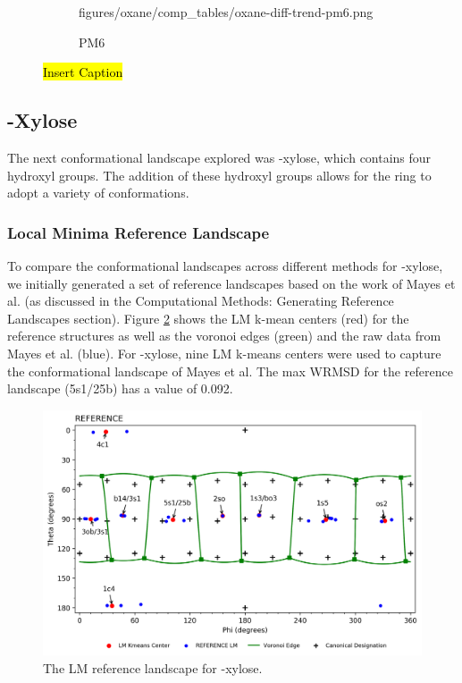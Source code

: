 \documentclass{article}
\begin{document}
\begin{figure}[H]
\begin{subfigure}[b]{0.3\textwidth}
		{figures/oxane/comp_tables/oxane-diff-trend-pm6.png}
		\caption{PM6}
	\end{subfigure}
\caption{\hl{Insert Caption}}
\label{fig:oxane-ALL-LM}
\end{figure}



\newpage
\subsection{\textbeta-Xylose}
The next conformational landscape explored was \textbeta-xylose, which contains four hydroxyl groups. The addition of 
these hydroxyl groups allows for the ring to adopt a variety of conformations. 

\subsubsection{Local Minima Reference Landscape}
To compare the conformational landscapes across different methods for \textbeta-xylose, we initially generated a set of reference landscapes 
based on the work of Mayes et al. (as discussed in the Computational Methods: Generating Reference Landscapes section). Figure 
\ref{fig:bxyl-ref-LM} shows the LM k-mean centers (red) for the reference structures as well as the voronoi edges (green) and the raw data 
from Mayes et al. (blue). For \textbeta-xylose, nine LM k-means centers were used to capture the conformational landscape of Mayes et al. 
The max WRMSD for the reference landscape (5s1/25b) has a value of 0.092.

\begin{figure}[h!]
  	\centering
  	\includegraphics[width=\textwidth,height=\textheight,keepaspectratio]
	{figures/bxyl/overall/z_dataset-bxyl-LM-REFERENCE-all_groupings.png}
	\caption{The LM reference landscape for \textbeta-xylose.}
 	\label{fig:bxyl-ref-LM}
\end{figure}
\end{document}
